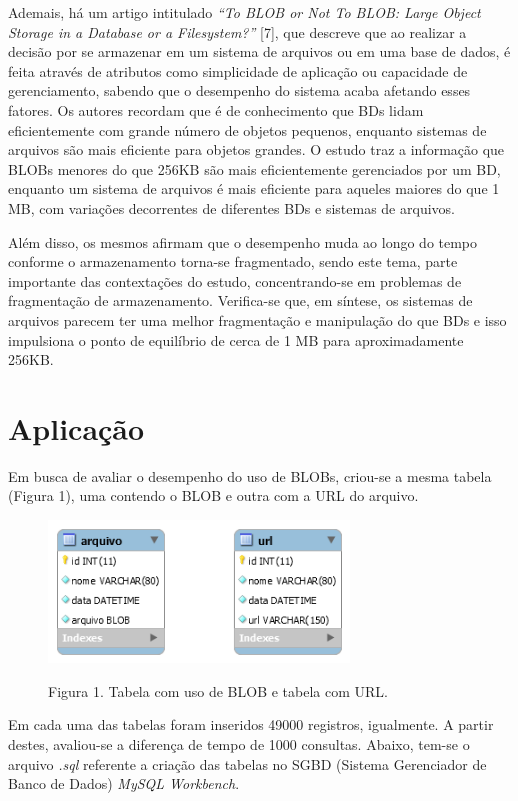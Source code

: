 \documentclass[12pt,a4paper]{article}
\begin{document}
Ademais, há um artigo intitulado \textit{``To BLOB or Not To BLOB: Large Object Storage in a Database or a Filesystem?''} [7], que descreve que ao realizar a decisão por se armazenar em um sistema de arquivos ou em uma base de dados, é feita através de atributos como simplicidade de aplicação ou capacidade de gerenciamento, sabendo que o desempenho do sistema acaba afetando esses fatores. Os autores recordam que é de conhecimento que BDs lidam eficientemente com
grande número de objetos pequenos, enquanto sistemas de arquivos são mais eficiente para objetos grandes. O estudo traz a informação que BLOBs menores do que 256KB são mais eficientemente gerenciados por um BD, enquanto um sistema de arquivos é mais eficiente para aqueles maiores do que 1 MB, com variações decorrentes de diferentes BDs e sistemas de arquivos.

Além disso, os mesmos afirmam que o desempenho muda ao longo do tempo conforme o armazenamento torna-se fragmentado, sendo este tema, parte importante das contextações do estudo, concentrando-se em problemas de fragmentação de armazenamento. Verifica-se que, em síntese, os sistemas de arquivos parecem ter uma melhor fragmentação e manipulação do que BDs e isso impulsiona o ponto de equilíbrio de cerca de 1 MB para aproximadamente 256KB.


\section{Aplicação}
Em busca de avaliar o desempenho do uso de BLOBs, criou-se a mesma tabela (Figura 1), uma contendo o BLOB e outra com a URL do arquivo.

\begin{figure}[htb]
	\label{figura:tabelas}
	\centering
	\includegraphics[width=8cm]{recursos/imagens/tabelas.png} 
	
	Figura 1. Tabela com uso de BLOB e tabela com URL.
\end{figure}

Em cada uma das tabelas foram inseridos 49000 registros, igualmente. A partir destes, avaliou-se a diferença de tempo de 1000 consultas. Abaixo, tem-se o arquivo \textit{.sql} referente a criação das tabelas no SGBD (Sistema Gerenciador de Banco de Dados) \textit{MySQL Workbench}. \\\vspace{0.1cm}
\end{document}
